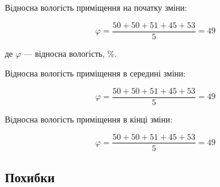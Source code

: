 Відносна вологість приміщення на початку зміни:

\begin{equation}
  \varphi = \frac{50 + 50 + 51 + 45 + 53}{5} = 49
\end{equation}

де $\varphi$ --- відносна вологість, \%.

Відносна вологість приміщення в середині зміни:

\begin{equation}
  \varphi = \frac{50 + 50 + 51 + 45 + 53}{5} = 49
\end{equation}

Відносна вологість приміщення в кінці зміни:

\begin{equation}
  \varphi = \frac{50 + 50 + 51 + 45 + 53}{5} = 49
\end{equation}

\subsection{Похибки}